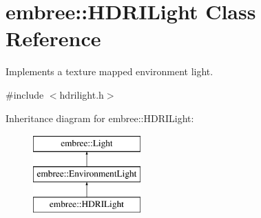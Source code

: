 \hypertarget{classembree_1_1_h_d_r_i_light}{
\section{embree::HDRILight Class Reference}
\label{classembree_1_1_h_d_r_i_light}
}


Implements a texture mapped environment light.  




{\ttfamily \#include $<$hdrilight.h$>$}

Inheritance diagram for embree::HDRILight:\begin{figure}[H]
\begin{center}
\leavevmode
\includegraphics[height=3.000000cm]{classembree_1_1_h_d_r_i_light}
\end{center}
\end{figure}
